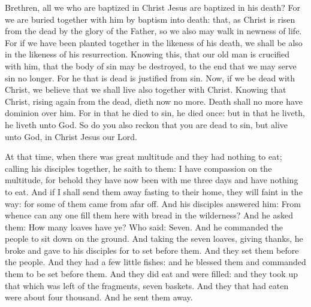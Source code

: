 \begin{multicols}{2}
\bigskip



Brethren, all we who are baptized in Christ Jesus are
baptized in his death?
For we are buried together with him by baptism into death: that, as
Christ is risen from the dead by the glory of the Father, so we also may
walk in newness of life.
For if we have been planted together in the likeness of his death,
we shall be also in the likeness of his resurrection.
Knowing this, that our old man is crucified with him, that the body
of sin may be destroyed, to the end that we may serve sin no longer.
For he that is dead is justified from sin.
Now, if we be dead with Christ, we believe that we shall live also
together with Christ.
Knowing that Christ, rising again from the dead, dieth now no more.
Death shall no more have dominion over him.
For in that he died to sin, he died once: but in that he liveth,
he liveth unto God.
So do you also reckon that you are dead to sin, but alive unto
God, in Christ Jesus our Lord.



At that time, when there was great multitude and they had
nothing to eat; calling his disciples together, he saith to them:
I have compassion on the multitude, for behold they have now been
with me three days and have nothing to eat.
And if I shall send them away fasting to their home, they will
faint in the way: for some of them came from afar off.
And his disciples answered him: From whence can any one fill them
here with bread in the wilderness?
And he asked them: How many loaves have ye? Who said: Seven.
And he commanded the people to sit down on the ground. And taking
the seven loaves, giving thanks, he broke and gave to his disciples for
to set before them. And they set them before the people.
And they had a few little fishes: and he blessed them and commanded
them to be set before them.
And they did eat and were filled: and they took up that which was
left of the fragments, seven baskets.
And they that had eaten were about four thousand. And he sent them
away.



\bigskip


\end{multicols}
